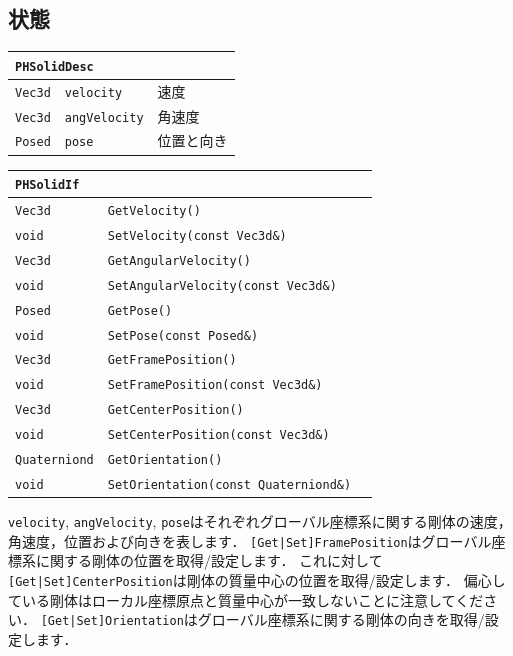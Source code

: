 \subsection*{\KLUDGE 状態}

\begin{center}
\begin{tabular}{p{.15\hsize}p{.45\hsize}p{.30\hsize}}
\multicolumn{3}{l}{\texttt{PHSolidDesc}}							\\ \midrule
\texttt{Vec3d}	&	\texttt{velocity}		& \KLUDGE 速度					\\
\texttt{Vec3d}	&	\texttt{angVelocity}	& \KLUDGE 角速度				\\
\texttt{Posed}	&	\texttt{pose}			& \KLUDGE 位置と向き			\\
\end{tabular}
\end{center}

\begin{center}
\begin{tabular}{p{.2\hsize}p{.5\hsize}p{.20\hsize}}
\multicolumn{3}{l}{\texttt{PHSolidIf}}									\\ \midrule
\texttt{Vec3d}			& \texttt{GetVelocity()}						& \\
\texttt{void} 			& \texttt{SetVelocity(const Vec3d\&)}			& \\
\texttt{Vec3d} 			& \texttt{GetAngularVelocity()}					& \\
\texttt{void} 			& \texttt{SetAngularVelocity(const Vec3d\&)}	& \\
\texttt{Posed} 			& \texttt{GetPose()}							& \\
\texttt{void} 			& \texttt{SetPose(const Posed\&)}				& \\
\texttt{Vec3d} 			& \texttt{GetFramePosition()}					& \\
\texttt{void} 			& \texttt{SetFramePosition(const Vec3d\&)}		& \\
\texttt{Vec3d} 			& \texttt{GetCenterPosition()}					& \\
\texttt{void} 			& \texttt{SetCenterPosition(const Vec3d\&)}		& \\
\texttt{Quaterniond} 	& \texttt{GetOrientation()}						& \\
\texttt{void} 			& \texttt{SetOrientation(const Quaterniond\&)}	& \\
\end{tabular}
\end{center}

\texttt{velocity}, \texttt{angVelocity}, \texttt{pose}\KLUDGE はそれぞれグローバル座標系に関する剛体の速度，角速度，位置および向きを表します．
\texttt{[Get|Set]FramePosition}\KLUDGE はグローバル座標系に関する剛体の位置を取得/\KLUDGE 設定します．
\KLUDGE これに対して\texttt{[Get|Set]CenterPosition}\KLUDGE は剛体の質量中心の位置を取得/\KLUDGE 設定します．
\KLUDGE 偏心している剛体はローカル座標原点と質量中心が一致しないことに注意してください．
\texttt{[Get|Set]Orientation}\KLUDGE はグローバル座標系に関する剛体の向きを取得/\KLUDGE 設定します．



